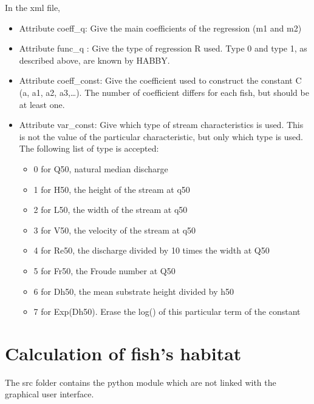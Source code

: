 \documentclass[letterpaper,10pt,english]{sphinxmanual}
\begin{document}
In the xml file,
\begin{itemize}
\item {} 
Attribute coeff\_q: Give the main coefficients of the regression (m1 and m2)

\item {} 
Attribute func\_q : Give the type of regression R used.  Type 0 and type 1, as described above, are known by HABBY.

\item {} 
Attribute coeff\_const: Give the coefficient used to construct the constant C (a, a1, a2, a3,…). The number of coefficient differs for each fish, but should be at least one.

\item {} 
Attribute var\_const: Give which type of stream characteristics is used. This is not the value of the particular characteristic, but only which type is used. The following list of type is accepted:
\begin{itemize}
\item {} 
0 for Q50, natural median discharge

\item {} 
1 for H50, the height of the stream at q50

\item {} 
2 for L50, the width of the stream at q50

\item {} 
3 for V50, the velocity of the stream at q50

\item {} 
4 for Re50, the discharge divided by 10 times the width at Q50

\item {} 
5 for Fr50, the Froude number at Q50

\item {} 
6 for Dh50, the mean substrate height divided by h50

\item {} 
7 for Exp(Dh50). Erase the log() of this particular term of the constant

\end{itemize}

\end{itemize}


\chapter{Calculation of fish's habitat}
\label{\detokenize{index:calculation-of-fish-s-habitat}}
The src folder contains the python module which are not linked with the graphical user interface.
\label{\detokenize{index:module-src}}
\end{document}
